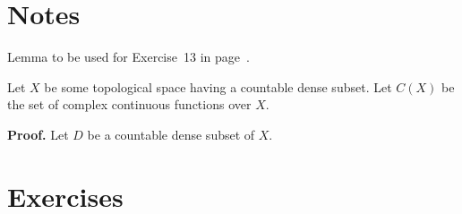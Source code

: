 \section{Notes}

Lemma to be used for Exercise~13 in page~\pageref{ex:1:13}.

\begin{llem}
Let $X$ be some topological space having a countable dense subset.
Let \(C(X)\) be the set of complex continuous functions over $X$.
\end{llem}
\textbf{Proof.}
Let $D$ be a countable dense subset of $X$.

\proofend



\section{Exercises} %

